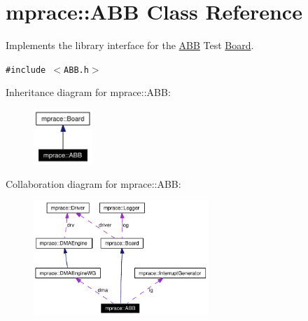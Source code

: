 \hypertarget{classmprace_1_1ABB}{
\section{mprace::ABB Class Reference}
\label{classmprace_1_1ABB}
}
Implements the library interface for the \hyperlink{classmprace_1_1ABB}{ABB} Test \hyperlink{classmprace_1_1Board}{Board}.  


{\tt \#include $<$ABB.h$>$}

Inheritance diagram for mprace::ABB:\begin{figure}[H]
\begin{center}
\leavevmode
\includegraphics[width=63pt]{classmprace_1_1ABB__inherit__graph}
\end{center}
\end{figure}
Collaboration diagram for mprace::ABB:\begin{figure}[H]
\begin{center}
\leavevmode
\includegraphics[width=187pt]{classmprace_1_1ABB__coll__graph}
\end{center}
\end{figure}
